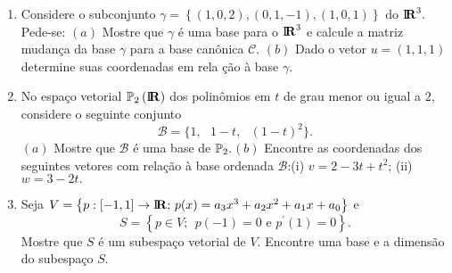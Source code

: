 \documentclass{report}
\begin{document}
\begin{Exercise}
\begin{enumerate}
\item \label{17lista3} Considere o subconjunto $\gamma =\left\{
\left( 1,0,2\right) ,\left(
0,1,-1\right) ,\left( 1,0,1\right) \right\} $ do $%
\mbox{${\rm I}\!\mbox{\boldmath $ {\rm R}$}$}%
^{3}.$ Pede-se:\newline
$(a)$ Mostre que $\mathcal{\gamma }$ \'{e} uma base para o $%
\mbox{${\rm I}\!\mbox{\boldmath $ {\rm R}$}$}%
^{3}$ e calcule a matriz mudan\c{c}a da base $\mathcal{\gamma }$ para a base
can\^{o}nica $\mathcal{C}.$\newline
$(b)$ Dado o vetor $u=\left( 1,1,1\right) $ determine suas coordenadas em rela%
\c{c}\~{a}o \`{a} base $\gamma .$


\item \label{27lista3} No espa\c{c}o vetorial $\Bbb{P}_{2}\left(
\mbox{${\rm I}\!\mbox{\boldmath $ {\rm R}$}$}%
\right) $ dos polin\^{o}mios em $t$ de grau menor ou igual a $2$, considere
o seguinte conjunto
\[
\mathcal{B}=\{1,\text{ }1-t,\text{ }(1-t)^{2}\}.
\]
$(a)$ Mostre que $\mathcal{B}$ \'{e} uma base de
$\Bbb{P}_{2}.$\newline $(b)$ Encontre as coordenadas dos seguintes
vetores com rela\c{c}\~{a}o \`{a} base ordenada
$\mathcal{B}$:\newline \qquad \qquad (i) $v=2-3t+t^{2}$; \qquad
\qquad (ii) $w=3-2t.$


\item \label{28lista3} Seja $V=\left\{ p:\left[ -1,1\right]
\rightarrow
\mbox{${\rm I}\!\mbox{\boldmath $ {\rm R}$}$}%
;\,p(x)=a_{3}x^{3}+a_{2}x^{2}+a_{1}x+a_{0}\right\} $ e
\[
S=\left\{ p\in V;\;\,p\left( -1\right) =0\text{ e }p^{\prime }\left(
1\right) =0\right\} .
\]
Mostre que $S$ \'{e} um subespa\c{c}o vetorial de $V.$ Encontre uma base e a
dimens\~{a}o do subespa\c{c}o $S$.


\end{enumerate}
\end{Exercise}
\end{document}
